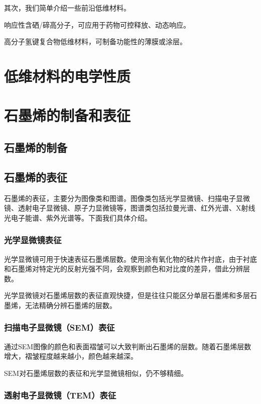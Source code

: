 其次，我们简单介绍一些前沿低维材料。

响应性含硒/碲高分子，可应用于药物可控释放、动态响应\cite{Pan2021}。

高分子氢键复合物低维材料，可制备功能性的薄膜或涂层。

\section{低维材料的电学性质}

\section{石墨烯的制备和表征}

\subsection{石墨烯的制备}

\subsection{石墨烯的表征}

石墨烯的表征，主要分为图像类和图谱\cite{Peng2013}。图像类包括光学显微镜、扫描电子显微镜、透射电子显微镜、原子力显微镜等，图谱类包括拉曼光谱、红外光谱、X射线光电子能谱、紫外光谱等。下面我们具体介绍。

\subsubsection{光学显微镜表征}

光学显微镜可用于快速表征石墨烯层数。使用涂有氧化物的硅片作衬底，由于衬底和石墨烯对特定光的反射光强不同，会观察到颜色和对比度的差异，借此分辨层数\cite{Novoselov2004}。

光学显微镜对石墨烯层数的表征直观快捷，但是往往只能区分单层石墨烯和多层石墨烯，无法精确分辨石墨烯的层数。

\subsubsection{扫描电子显微镜（SEM）表征}

通过SEM图像的颜色和表面褶皱可以大致判断出石墨烯的层数。随着石墨烯层数增大，褶皱程度越来越小，颜色越来越深。

SEM对石墨烯层数的表征和光学显微镜相似，仍不够精细。

\subsubsection{透射电子显微镜（TEM）表征}

